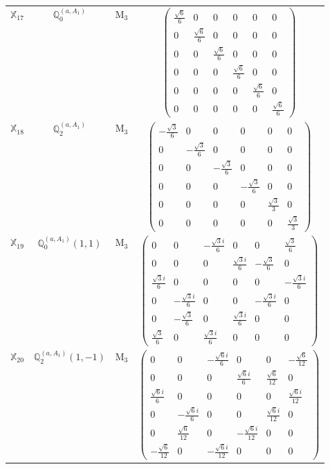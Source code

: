 \documentclass[fleqn,10pt,landscape]{article}
\begin{document}
\begin{itemize}
\begin{center}
\begin{longtable}{c|c|c|c}
$ \mathbb{X}_{17} $ & $\mathbb{Q}_{0}^{(a,A_{1})}$ & M$_{3}$ & $\begin{pmatrix} \frac{\sqrt{6}}{6} & 0 & 0 & 0 & 0 & 0 \\ 0 & \frac{\sqrt{6}}{6} & 0 & 0 & 0 & 0 \\ 0 & 0 & \frac{\sqrt{6}}{6} & 0 & 0 & 0 \\ 0 & 0 & 0 & \frac{\sqrt{6}}{6} & 0 & 0 \\ 0 & 0 & 0 & 0 & \frac{\sqrt{6}}{6} & 0 \\ 0 & 0 & 0 & 0 & 0 & \frac{\sqrt{6}}{6} \end{pmatrix}$ \\
$ \mathbb{X}_{18} $ & $\mathbb{Q}_{2}^{(a,A_{1})}$ & M$_{3}$ & $\begin{pmatrix} - \frac{\sqrt{3}}{6} & 0 & 0 & 0 & 0 & 0 \\ 0 & - \frac{\sqrt{3}}{6} & 0 & 0 & 0 & 0 \\ 0 & 0 & - \frac{\sqrt{3}}{6} & 0 & 0 & 0 \\ 0 & 0 & 0 & - \frac{\sqrt{3}}{6} & 0 & 0 \\ 0 & 0 & 0 & 0 & \frac{\sqrt{3}}{3} & 0 \\ 0 & 0 & 0 & 0 & 0 & \frac{\sqrt{3}}{3} \end{pmatrix}$ \\
$ \mathbb{X}_{19} $ & $\mathbb{Q}_{0}^{(a,A_{1})}(1,1)$ & M$_{3}$ & $\begin{pmatrix} 0 & 0 & - \frac{\sqrt{3} i}{6} & 0 & 0 & \frac{\sqrt{3}}{6} \\ 0 & 0 & 0 & \frac{\sqrt{3} i}{6} & - \frac{\sqrt{3}}{6} & 0 \\ \frac{\sqrt{3} i}{6} & 0 & 0 & 0 & 0 & - \frac{\sqrt{3} i}{6} \\ 0 & - \frac{\sqrt{3} i}{6} & 0 & 0 & - \frac{\sqrt{3} i}{6} & 0 \\ 0 & - \frac{\sqrt{3}}{6} & 0 & \frac{\sqrt{3} i}{6} & 0 & 0 \\ \frac{\sqrt{3}}{6} & 0 & \frac{\sqrt{3} i}{6} & 0 & 0 & 0 \end{pmatrix}$ \\
$ \mathbb{X}_{20} $ & $\mathbb{Q}_{2}^{(a,A_{1})}(1,-1)$ & M$_{3}$ & $\begin{pmatrix} 0 & 0 & - \frac{\sqrt{6} i}{6} & 0 & 0 & - \frac{\sqrt{6}}{12} \\ 0 & 0 & 0 & \frac{\sqrt{6} i}{6} & \frac{\sqrt{6}}{12} & 0 \\ \frac{\sqrt{6} i}{6} & 0 & 0 & 0 & 0 & \frac{\sqrt{6} i}{12} \\ 0 & - \frac{\sqrt{6} i}{6} & 0 & 0 & \frac{\sqrt{6} i}{12} & 0 \\ 0 & \frac{\sqrt{6}}{12} & 0 & - \frac{\sqrt{6} i}{12} & 0 & 0 \\ - \frac{\sqrt{6}}{12} & 0 & - \frac{\sqrt{6} i}{12} & 0 & 0 & 0 \end{pmatrix}$ \\

\end{longtable}
\end{center}
\end{itemize}
\end{document}
